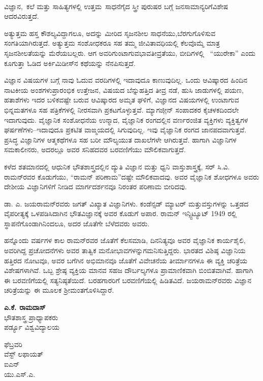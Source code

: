 \newpage

~
\thispagestyle{plain}

\vskip 1cm



\vskip 0.7cm


\noindent
ವಿಜ್ಞಾನ,~ಕಲೆ ಮತ್ತು ಸಾಹಿತ್ಯಗಳಲ್ಲಿ ಉತ್ತಮ~ಸಾಧನೆಗೈದ ಸ್ತ್ರೀ ಪುರುಷರ ಬಗ್ಗೆ ಜನಸಾಮಾನ್ಯರಿಗೆ\break ವಿಶೇಷ ಆದರವಿರುತ್ತದೆ.

ಅತ್ಯುತ್ತಮ ಹಸ್ತ ಕೌಶಲ್ಯವಿದ್ದಾಗಲೂ, ಅದನ್ನು ಮೀರಿದ ಸೃಜನಶೀಲ ಸಾಧನೆಯು,\break ಬೆರಗುಗೊಳಿಸುವ ಸಂಗತಿಯಾಗಿರುತ್ತದೆ. ಅತ್ಯುತ್ತಮ ಸಂಶೋಧಕರೂ ಸಹ ತಮ್ಮ ಜೀವಿತಾವಧಿಯಲ್ಲಿ ಕೆಲವೊಮ್ಮೆ ಮಾತ್ರ ಸೃಜನಶೀಲತೆಯನ್ನು ಮೆರೆಯಬಲ್ಲರು. ಆಗ ಅವರಿಗುಂಟಾಗುವ\break ಭಾವತೀವ್ರತೆಯು, ಬೀದಿಗಳಲ್ಲಿ ~“ಯುರೇಕಾ” ಎಂದು ಕೂಗುತ್ತಾ ಓಡಿದ ಅರ್ಕಿಮಿಡೀಸ್‍ನ ಕಥೆಯನ್ನು ನೆನಪಿಸುತ್ತದೆ.

ವಿಜ್ಞಾನ ವಿಷಯಗಳ ಬಗ್ಗೆ ನಾವು ಓದುವ ವರದಿಗಳಲ್ಲಿ ಇದಾವುದೂ ಕಾಣುವುದಿಲ್ಲ. ಒಂದು ಆವಿಷ್ಕಾರದ ಹಿಂದಿನ ನಾಟಕೀಯ ಅಂಶಗಳು\enginline{-}ಪ್ರಾರಂಭಿಕ ಉತ್ತೇಜನ, ವಿಷಯದ ಬೆನ್ನುಹತ್ತಿದ ತೀವ್ರ ನಡೆ, ಹುಸಿ ಜಾಡುಗಳಲ್ಲಿ ಪಯಣ, ಹತಾಶೆಗಳು ಇದರ ಬಳಿಕವಷ್ಟೇ ಬರುವ ಆವಿಷ್ಕಾರದ ಅಮೃತ ಘಳಿಗೆ, ವಿಜ್ಞಾನದ ವಿಷಯಗಳಲ್ಲಿ ಉಂಟಾಗುವ ಭಿನ್ನಮತಗಳೂ ಸಹ ಪತ್ರಿಕೆಗಳಲ್ಲಿ ನೀರಸವಾಗಿ ಪ್ರಕಟಗೊಳ್ಳುತ್ತವೆ. ಮ್ಯಾಗಜೀ಼ನ್ ಸಂಪಾದಕರ ಕೈಚಳಕದಿಂದಲೇ ಇದಾಗುವುದು. ವೈಜ್ಞಾನಿಕ ಸಂಶೋಧನೆಯ ಉನ್ಮಾದ, ವೈಜ್ಞಾನಿಕ ರಂಗದಲ್ಲಿನ ವರ್ಣರಂಜಿತ ವ್ಯಕ್ತಿಗಳು ವ್ಯಕ್ತಿತ್ವಗಳ ಘರ್ಷಣೆಗಳು–ಇದಾವುದೂ ಪ್ರಕಟಿತ ವಾಙ್ಮಯದಲ್ಲಿ ಸಿಗುವುದಿಲ್ಲ. ಇವು ವೈಜ್ಞಾನಿಕ ರಂಗದ ಜಾನಪದವಾಗುತ್ತವೆ. ಪ್ರಸಿದ್ಧ ವಿಜ್ಞಾನಿಗಳ ಆತ್ಮಕಥೆಗಳೂ ಸಹ ಬರೀ ಮೌಲ್ಯಯುತ ದಾಖಲೆಗಳೇ ಆಗಿರುತ್ತವೆ. ಹಾಗಾಗಿ ವಿಜ್ಞಾನಿಗಳ ಸಮಕಾಲೀನರು, ಅದರಲ್ಲೂ ಅವರ ಸನಿಹದವರ ಬರವಣಿಗೆಯು ಮೌಲಿಕವಾಗುತ್ತದೆ.

ಕಳೆದ ಶತಮಾನದಲ್ಲಿ ಆಧುನಿಕ ಭೌತಶಾಸ್ತ್ರದಲ್ಲಿನ ದ್ಯುತಿ ವಿಜ್ಞಾನ ಮತ್ತು ಧ್ವನಿ ವಾಸ್ತುಶಾಸ್ತ್ರಕ್ಕೆ, ಸರ್ ಸಿ.ವಿ. ರಾಮನ್‍ರವರ ಕೊಡುಗೆಯು, “ರಾಮನ್ ಪರಿಣಾಮ”ದಷ್ಟೇ ಮೌಲಿಕವಾದವು. ಅವರ ವೈಜ್ಞಾನಿಕ ಶೋಧಗಳೂ ಅವರು ದೇಶೀಯ ವಿಜ್ಞಾನಿಗಳಿಗೆ ನೀಡಿದ ಮಾರ್ಗದರ್ಶನವೂ ನಿರಂತರ ಪರಿಣಾಮ ಬೀರಿದವು.

ಡಾ. ಎ. ಜಯರಾಮನ್‍ರವರು ಜಗತ್ ವಿಖ್ಯಾತ ವಿಜ್ಞಾನಿಗಳು. ಕಂಡೆನ್ಸಡ್ ಮ್ಯಾಟರ್ ಮತ್ತು\break ವಸ್ತುಗಳನ್ನು ಒತ್ತಡದ ವೈಪರೀತ್ಯಕ್ಕೆ ಒಳಪಡಿಸಿದಾಗಿನ ಭೌತವಿಜ್ಞಾನಕ್ಕೆ ಅವರ ಕೊಡುಗೆ ಅಪಾರ. ರಾಮನ್ ಇನ್ಸ್ಟಿಟ್ಯೂಟ್ 1949 ರಲ್ಲಿ ಸ್ಥಾಪನೆಗೊಂಡಾಗಿನಿಂದಲೂ, ಅದರ ಜೊತೆಗೇ ಬೆಳೆದವರು ಅವರು.

\eject

ಹನ್ನೊಂದು ವರ್ಷಗಳ ಕಾಲ ರಾಮನ್‍ರವರ ಜೊತೆಗೆ ಕೆಲಸಮಾಡಿ, ದಿನನಿತ್ಯವೂ ಅವರ ವೈಜ್ಞಾನಿಕ ಕಾರ್ಯಶೈಲಿ, ಅವರಿಗಿದ್ದ ಪ್ರಚೋದನೆಗಳು ಅವರ ತಾತ್ವಿಕ ಮನೋಭಾವಗಳನ್ನು\break ಗಮನಿಸುತ್ತಿದ್ದರು. ಭಾರತದ ವಿಶಿಷ್ಠ ವಿಜ್ಞಾನಿಯ ಹತ್ತಿರದ ನೋಟವೂ, ಅವರ ಬಗೆಗಿನ ಅಭಿಮಾನವೂ ಜೊತೆಗೆ ವಿವೇಚನೆಯ ತೀರ್ಮಾನಗಳೂ ಈ ವ್ಯಕ್ತಿ ಚರಿತ್ರೆಯ ವಿಶೇಷಗಳಾಗಿವೆ. ಒಬ್ಬ ಶ್ರೇಷ್ಠ ವ್ಯಕ್ತಿಯ ಮಾನವ ಸಹಜ ದೌರ್ಬಲ್ಯಗಳೂ ಪ್ರಾಮಾಣಿಕವಾಗಿ ಬಿಂಬಿತವಾಗಿವೆ. ಹಾಗಾಗಿ ಈ ಬರವಣಿಗೆಯಲ್ಲಿ ಸತ್ಯನಿಷ್ಠತೆಯಿದೆ. ಬರಹಗಾರರಿಗೆ ಬರವಣಿಗೆಯಲ್ಲಿ ಹಿಡಿತವಿದೆ. ಜಯರಾಮನ್‍ರವರು ವಿಜ್ಞಾನ ಚರಿತ್ರೆಯನ್ನು ಈ ಮೂಲಕ ಶ‍್ರೀಮಂತಗೊಳಿಸಿದ್ದಾರೆ.

\begin{flushright}
 \textbf{ಎ.ಕೆ. ರಾಮದಾಸ್}\\
 ಭೌತಶಾಸ್ತ್ರ ಪ್ರಾಧ್ಯಾಪಕರು\\
 ಪರ್ಡ್ಯೂ ವಿಶ್ವವಿದ್ಯಾಲಯ
\end{flushright}

\begin{flushleft}
  ಫೆಬ್ರವರಿ \\
 ವೆಸ್ಟ್ ಲಫಾಯತ್\\
 ಐಎನ್ \\
 ಯು.ಎಸ್.ಎ.
\end{flushleft}

\begin{flushright}
\end{flushright}
‌  
